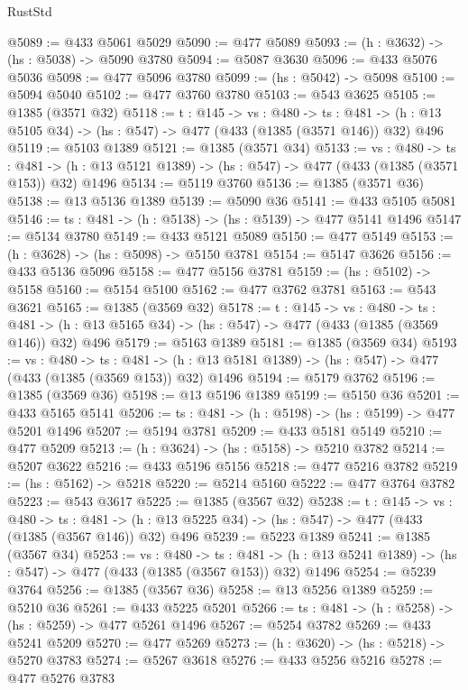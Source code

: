 \begin{lexlean}{RustStd}
\begin{coremodule}
@5089 := @433 @5061 @5029
@5090 := @477 @5089
@5093 := (h : @3632) -> (hs : @5038) -> @5090 @3780
@5094 := @5087 @3630
@5096 := @433 @5076 @5036
@5098 := @477 @5096 @3780
@5099 := (hs : @5042) -> @5098
@5100 := @5094 @5040
@5102 := @477 @3760 @3780
@5103 := @543 @3625
@5105 := @1385 (@3571 @32)
@5118 := {t : @145} ->
  {vs : @480} ->
  {ts : @481} -> (h : @13 @5105 @34) -> (hs : @547) -> @477 (@433 (@1385 (@3571 @146)) @32) @496
@5119 := @5103 @1389
@5121 := @1385 (@3571 @34)
@5133 := {vs : @480} ->
  {ts : @481} -> (h : @13 @5121 @1389) -> (hs : @547) -> @477 (@433 (@1385 (@3571 @153)) @32) @1496
@5134 := @5119 @3760
@5136 := @1385 (@3571 @36)
@5138 := @13 @5136 @1389
@5139 := @5090 @36
@5141 := @433 @5105 @5081
@5146 := {ts : @481} -> (h : @5138) -> (hs : @5139) -> @477 @5141 @1496
@5147 := @5134 @3780
@5149 := @433 @5121 @5089
@5150 := @477 @5149
@5153 := (h : @3628) -> (hs : @5098) -> @5150 @3781
@5154 := @5147 @3626
@5156 := @433 @5136 @5096
@5158 := @477 @5156 @3781
@5159 := (hs : @5102) -> @5158
@5160 := @5154 @5100
@5162 := @477 @3762 @3781
@5163 := @543 @3621
@5165 := @1385 (@3569 @32)
@5178 := {t : @145} ->
  {vs : @480} ->
  {ts : @481} -> (h : @13 @5165 @34) -> (hs : @547) -> @477 (@433 (@1385 (@3569 @146)) @32) @496
@5179 := @5163 @1389
@5181 := @1385 (@3569 @34)
@5193 := {vs : @480} ->
  {ts : @481} -> (h : @13 @5181 @1389) -> (hs : @547) -> @477 (@433 (@1385 (@3569 @153)) @32) @1496
@5194 := @5179 @3762
@5196 := @1385 (@3569 @36)
@5198 := @13 @5196 @1389
@5199 := @5150 @36
@5201 := @433 @5165 @5141
@5206 := {ts : @481} -> (h : @5198) -> (hs : @5199) -> @477 @5201 @1496
@5207 := @5194 @3781
@5209 := @433 @5181 @5149
@5210 := @477 @5209
@5213 := (h : @3624) -> (hs : @5158) -> @5210 @3782
@5214 := @5207 @3622
@5216 := @433 @5196 @5156
@5218 := @477 @5216 @3782
@5219 := (hs : @5162) -> @5218
@5220 := @5214 @5160
@5222 := @477 @3764 @3782
@5223 := @543 @3617
@5225 := @1385 (@3567 @32)
@5238 := {t : @145} ->
  {vs : @480} ->
  {ts : @481} -> (h : @13 @5225 @34) -> (hs : @547) -> @477 (@433 (@1385 (@3567 @146)) @32) @496
@5239 := @5223 @1389
@5241 := @1385 (@3567 @34)
@5253 := {vs : @480} ->
  {ts : @481} -> (h : @13 @5241 @1389) -> (hs : @547) -> @477 (@433 (@1385 (@3567 @153)) @32) @1496
@5254 := @5239 @3764
@5256 := @1385 (@3567 @36)
@5258 := @13 @5256 @1389
@5259 := @5210 @36
@5261 := @433 @5225 @5201
@5266 := {ts : @481} -> (h : @5258) -> (hs : @5259) -> @477 @5261 @1496
@5267 := @5254 @3782
@5269 := @433 @5241 @5209
@5270 := @477 @5269
@5273 := (h : @3620) -> (hs : @5218) -> @5270 @3783
@5274 := @5267 @3618
@5276 := @433 @5256 @5216
@5278 := @477 @5276 @3783

\end{coremodule}
\end{lexlean}
